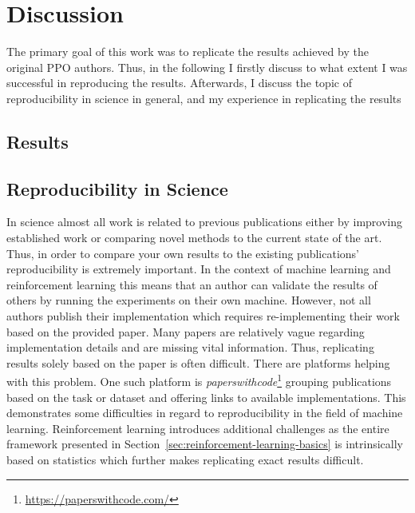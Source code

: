 \chapter{Discussion}\label{ch:discussion}
The primary goal of this work was to replicate the results achieved by the original PPO authors.
Thus, in the following I firstly discuss to what extent I was successful in reproducing the results.
Afterwards, I discuss the topic of reproducibility in science in general, and my experience in replicating the results

\section{Results}\label{sec:disc_results} %


\section{Reproducibility in Science}\label{sec:disc_repro}
In science almost all work is related to previous publications either by improving established work
or comparing novel methods to the current state of the art.
Thus, in order to compare your own results to the existing publications' reproducibility is extremely important.
In the context of machine learning and reinforcement learning this means that an author can validate the results of
others by running the experiments on their own machine.
However, not all authors publish their implementation which requires re-implementing their work based on the provided paper.
Many papers are relatively vague regarding implementation details and are missing vital information.
Thus, replicating results solely based on the paper is often difficult.
There are platforms helping with this problem.
One such platform is \textit{paperswithcode}\footnote{\url{https://paperswithcode.com/}}
grouping publications based on the task or dataset and offering links to available implementations.
This demonstrates some difficulties in regard to reproducibility in the field of machine learning.
Reinforcement learning introduces additional challenges as the entire framework presented in Section~\ref{sec:reinforcement-learning-basics}
is intrinsically based on statistics which further makes replicating exact results difficult.\\ %

